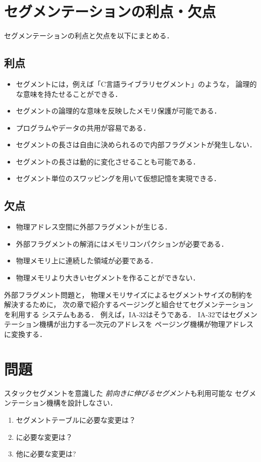 \section{セグメンテーションの利点・欠点}
セグメンテーションの利点と欠点を以下にまとめる．

\subsection*{利点}
\begin{itemize}
\item セグメントには，例えば「C言語ライブラリセグメント」のような，
論理的な意味を持たせることができる．
\item セグメントの論理的な意味を反映したメモリ保護が可能である．
\item プログラムやデータの共用が容易である．
\item セグメントの長さは自由に決められるので内部フラグメントが発生しない．
\item セグメントの長さは動的に変化させることも可能である．
\item セグメント単位のスワッピングを用いて仮想記憶を実現できる．
\end{itemize}

\subsection*{欠点}
\begin{itemize}
\item 物理アドレス空間に外部フラグメントが生じる．
\item 外部フラグメントの解消にはメモリコンパクションが必要である．
\item 物理メモリ上に連続した領域が必要である．
\item 物理メモリより大きいセグメントを作ることができない．
\end{itemize}

外部フラグメント問題と，
物理メモリサイズによるセグメントサイズの制約を解決するために，
次の章で紹介するページングと組合せてセグメンテーションを利用する
システムもある．
例えば，IA-32はそうである．
IA-32ではセグメンテーション機構が出力する一次元のアドレスを
ページング機構が物理アドレスに変換する．

\section*{問題}
スタックセグメントを意識した
\emph{前向きに伸びるセグメント}も利用可能な
セグメンテーション機構を設計しなさい．

\begin{enumerate}
\item セグメントテーブルに必要な変更は？
\item {}に必要な変更は？
\item 他に必要な変更は?
\end{enumerate}
